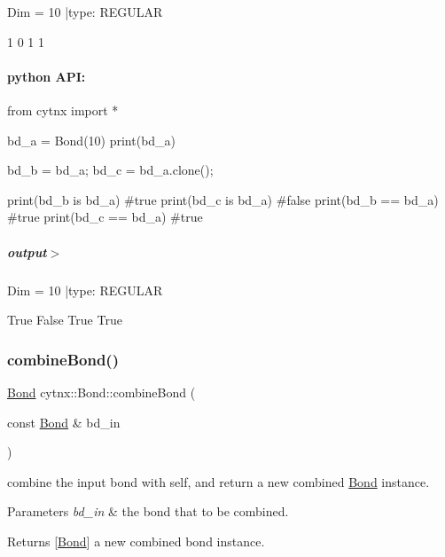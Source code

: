 \begin{DoxyVerbInclude}
Dim = 10 |type: REGULAR 

1
0
1
1
\end{DoxyVerbInclude}
 \paragraph*{python A\+PI\+:}


\begin{DoxyCodeInclude}
\textcolor{keyword}{from} cytnx \textcolor{keyword}{import} *

bd\_a = Bond(10)
print(bd\_a)

bd\_b = bd\_a;
bd\_c = bd\_a.clone();

print(bd\_b \textcolor{keywordflow}{is} bd\_a) \textcolor{comment}{#true}
print(bd\_c \textcolor{keywordflow}{is} bd\_a) \textcolor{comment}{#false}
print(bd\_b == bd\_a) \textcolor{comment}{#true}
print(bd\_c == bd\_a) \textcolor{comment}{#true}
\end{DoxyCodeInclude}
 \subparagraph*{output$>$}


\begin{DoxyVerbInclude}
Dim = 10 |type: REGULAR 


True
False
True
True
\end{DoxyVerbInclude}
 \mbox{\label{classcytnx_1_1Bond_a609c034885efa32fc244be82a56e1f8c}} 
\subsubsection{\texorpdfstring{combine\+Bond()}{combineBond()}}
{\footnotesize\ttfamily \hyperlink{classcytnx_1_1Bond}{Bond} cytnx\+::\+Bond\+::combine\+Bond (\begin{DoxyParamCaption}\item[{const \hyperlink{classcytnx_1_1Bond}{Bond} \&}]{bd\+\_\+in }\end{DoxyParamCaption})\hspace{0.3cm}{\ttfamily [inline]}}



combine the input bond with self, and return a new combined \hyperlink{classcytnx_1_1Bond}{Bond} instance. 


\begin{DoxyParams}{Parameters}
{\em bd\+\_\+in} & the bond that to be combined. \\
\hline
\end{DoxyParams}
\begin{DoxyReturn}{Returns}
\mbox{[}\hyperlink{classcytnx_1_1Bond}{Bond}\mbox{]} a new combined bond instance. 
\end{DoxyReturn}
\mbox{\label{classcytnx_1_1Bond_ac21ab26ec469ac56ae78c9e4bbbe7040}} 
